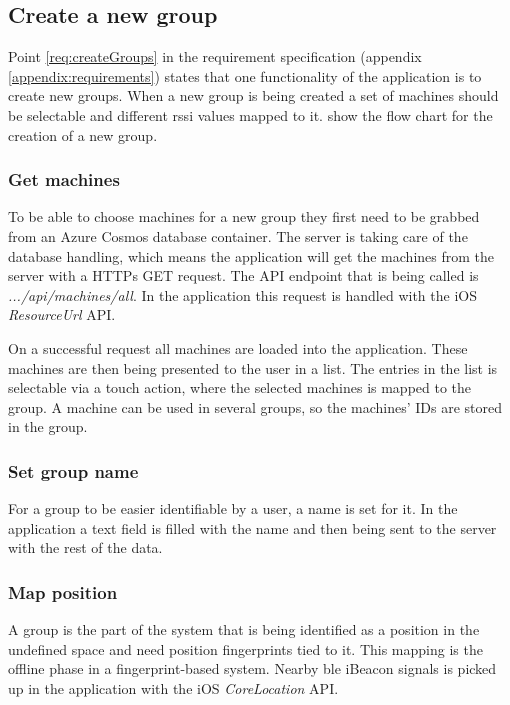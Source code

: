 \subsection{Create a new group}\label{sec:implAppNewGroup}
Point \ref{req:createGroups} in the requirement specification (appendix \ref{appendix:requirements}) states that one functionality of the application is to create new groups.
When a new group is being created a set of machines should be selectable and different \acrfull{rssi} values mapped to it.
 show the flow chart for the creation of a new group.



\subsubsection{Get machines}\label{sec:implAppNewGroupGetMachines}
To be able to choose machines for a new group they first need to be grabbed from an Azure Cosmos database container.
The server is taking care of the database handling, which means the application will get the machines from the server with a HTTPs GET request.
The API endpoint that is being called is \textit{.../api/machines/all}.
In the application this request is handled with the iOS \textit{ResourceUrl} API.

\bigskip

On a successful request all machines are loaded into the application.
These machines are then being presented to the user in a list.
The entries in the list is selectable via a touch action, where the selected machines is mapped to the group.
A machine can be used in several groups, so the machines' IDs are stored in the group. 


\subsubsection{Set group name}\label{sec:implAppNewGroupSetName}
For a group to be easier identifiable by a user, a name is set for it.
In the application a text field is filled with the name and then being sent to the server with the rest of the data.


\subsubsection{Map position}\label{sec:implAppNewGroupMapPos}
A group is the part of the system that is being identified as a position in the undefined space and need position fingerprints tied to it.
This mapping is the offline phase in a fingerprint-based system.
Nearby \acrfull{ble} iBeacon signals is picked up in the application with the iOS \textit{CoreLocation} API.

